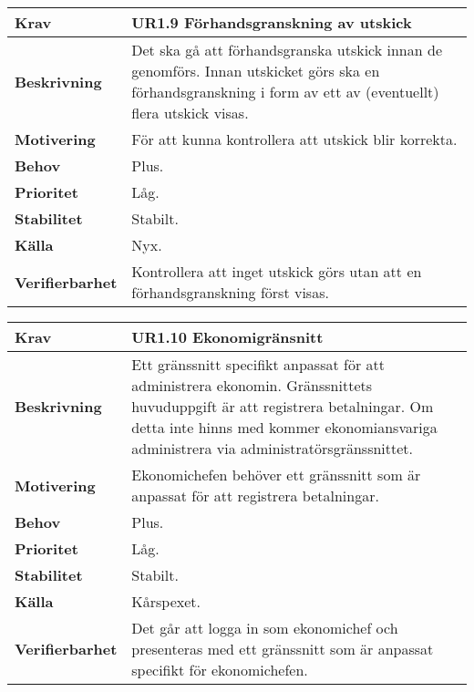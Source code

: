 \documentclass[a4paper, twoside, 11pt, titlepage]{article}
\begin{document}
		\begin {table} [ht] \begin{tabular} { p{2.6cm} p{12.5cm} }
			\hline
			{\sffamily\textbf{Krav}} & {\sffamily\textbf{UR1.9 Förhandsgranskning av utskick }} \\
			\hline
			{\sffamily\textbf{Beskrivning}} & {Det ska gå att förhandsgranska utskick innan de genomförs. Innan utskicket görs ska en förhandsgranskning i form av ett av (eventuellt) flera utskick visas.} \\
			\hline
			{\sffamily\textbf{Motivering}} & {För att kunna kontrollera att utskick blir korrekta.} \\
			\hline
			{\sffamily\textbf{Behov}} & {Plus.} \\
			\hline
			{\sffamily\textbf{Prioritet}} & {Låg.} \\
			\hline
			{\sffamily\textbf{Stabilitet}} & {Stabilt.} \\
			\hline
			{\sffamily\textbf{Källa}} & {Nyx.} \\
			\hline
			{\sffamily\textbf{Verifierbarhet}} & {Kontrollera att inget utskick görs utan att en förhandsgranskning först visas.} \\
			\hline
		\end{tabular} \end{table} \FloatBarrier
		\vspace{6mm}

		\begin {table} [ht] \begin{tabular} { p{2.6cm} p{12.5cm} }
			\hline
			{\sffamily\textbf{Krav}} & {\sffamily\textbf{UR1.10 Ekonomigränsnitt }} \\
			\hline
			{\sffamily\textbf{Beskrivning}} & {Ett gränssnitt specifikt anpassat för att administrera ekonomin. Gränssnittets huvuduppgift är att registrera betalningar. Om detta inte hinns med kommer ekonomiansvariga administrera via administratörsgränssnittet.} \\
			\hline
			{\sffamily\textbf{Motivering}} & {Ekonomichefen behöver ett gränssnitt som är anpassat för att registrera betalningar.} \\
			\hline
			{\sffamily\textbf{Behov}} & {Plus.} \\
			\hline
			{\sffamily\textbf{Prioritet}} & {Låg.} \\
			\hline
			{\sffamily\textbf{Stabilitet}} & {Stabilt.} \\
			\hline
			{\sffamily\textbf{Källa}} & {Kårspexet.} \\
			\hline
			{\sffamily\textbf{Verifierbarhet}} & {Det går att logga in som ekonomichef och presenteras med ett gränssnitt som är anpassat specifikt för ekonomichefen.} \\
			\hline
		\end{tabular} \end{table} \FloatBarrier
		\vspace{6mm}
\end{document}
